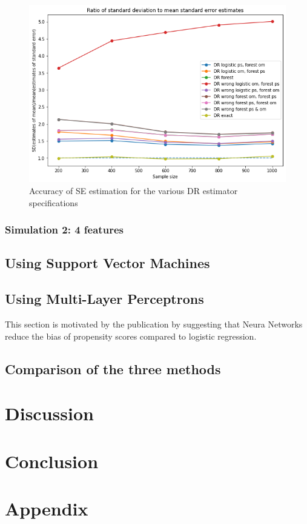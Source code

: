 \documentclass[12pt,twoside]{article}
\begin{document}
\begin{figure}[h!]
    \centering
    \includegraphics[width = 0.9\columnwidth]{figures/rf_2W_SE.png}
    \caption{Accuracy of \citet{lunceford_davidian} SE estimation for the various DR estimator specifications}
    \label{figSEpara}
\end{figure}

\subsubsection{Simulation 2: 4 features}

\subsection{Using Support Vector Machines}

\subsection{Using Multi-Layer Perceptrons}

This section is motivated by the publication by \citet{setoguchi-nn} suggesting that Neura Networks reduce the bias of propensity scores compared to logistic regression.
\subsection{Comparison of the three methods}

\section{Discussion}

\section{Conclusion}

\section{Appendix}
\clearpage


\end{document}
